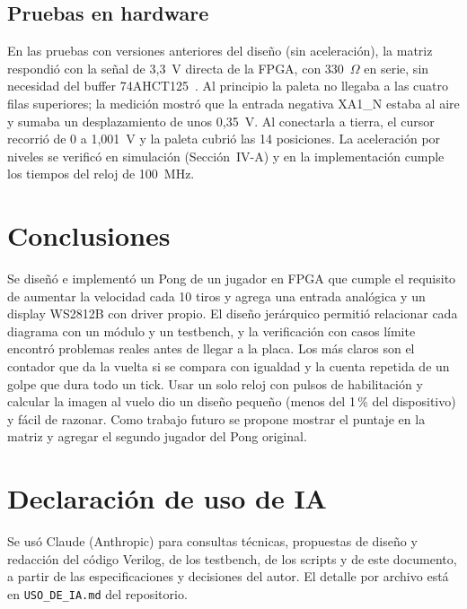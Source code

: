 \documentclass[conference]{IEEEtran}
\begin{document}
\subsection{Pruebas en hardware}
En las pruebas con versiones anteriores del diseño (sin aceleración), la matriz respondió con la señal de
3{,}3~V directa de la FPGA, con 330~$\Omega$ en serie, sin necesidad del buffer 74AHCT125~\cite{ahct}. Al principio la paleta no llegaba a las cuatro filas superiores; la
medición mostró que la entrada negativa XA1\_N estaba al aire y sumaba un desplazamiento de unos
0{,}35~V. Al conectarla a tierra, el cursor recorrió de 0 a 1{,}001~V y la paleta cubrió las 14
posiciones. La aceleración por niveles se verificó en simulación (Sección~IV-A) y en la
implementación cumple los tiempos del reloj de 100~MHz.

\section{Conclusiones}
Se diseñó e implementó un Pong de un jugador en FPGA que cumple el requisito de aumentar la velocidad
cada 10 tiros y agrega una entrada analógica y un display WS2812B con driver propio.
El diseño jerárquico permitió relacionar cada diagrama con un módulo y un testbench, y la verificación
con casos límite encontró problemas reales antes de llegar a la placa. Los más claros son el contador
que da la vuelta si se compara con igualdad y la cuenta repetida de un golpe que dura todo un tick. Usar
un solo reloj con pulsos de habilitación y calcular la imagen al vuelo dio un diseño pequeño (menos del
1\,\% del dispositivo) y fácil de razonar. Como trabajo futuro se propone mostrar el puntaje en la matriz
y agregar el segundo jugador del Pong original.

\section*{Declaración de uso de IA}
Se usó Claude (Anthropic) para consultas técnicas, propuestas de diseño y redacción del código
Verilog, de los testbench, de los scripts y de este documento, a partir de las especificaciones y
decisiones del autor. El detalle por archivo está en \texttt{USO\_DE\_IA.md} del repositorio.
\end{document}
